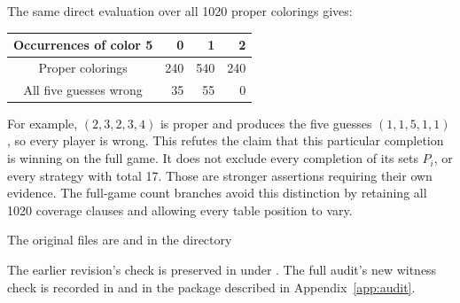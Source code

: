 The same direct evaluation over all 1020 proper colorings gives:
\begin{center}
\begin{tabular}{@{}crrr@{}}
\toprule
Occurrences of color 5&0&1&2\\
\midrule
Proper colorings&240&540&240\\
All five guesses wrong&35&55&0\\
\bottomrule
\end{tabular}
\end{center}
For example, $(2,3,2,3,4)$ is proper and produces the five guesses
$(1,1,5,1,1)$, so every player is wrong. This refutes the claim that
this particular completion is winning on the full game. It does not
exclude every completion of its sets $P_i$, or every strategy with total
17. Those are stronger assertions requiring their own evidence. The
full-game count branches avoid this distinction by retaining all 1020
coverage clauses and allowing every table position to vary.

The original files are  and
 in the directory
\begin{quote}\small\raggedright
{}
\end{quote}
The earlier revision's check is preserved in
under . The full audit's new witness check is
recorded in  and
 in the package described in
Appendix~\ref{app:audit}.
